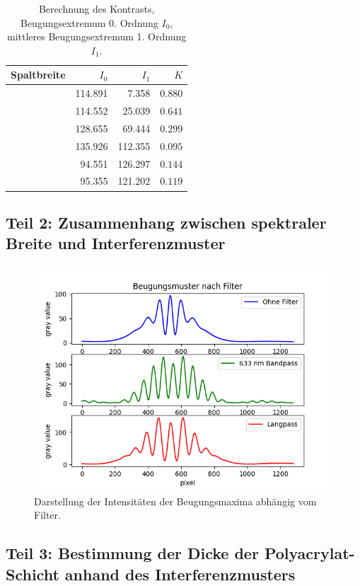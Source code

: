 \documentclass{article}
\begin{document}
\begin{table}[H]
\caption{Berechnung des Kontrasts, Beugungsextremum 0. Ordnung $I_0$, mittleres Beugungsextremum 1. Ordnung $I_1$.}
\begin{tabular}{l|rr|r}
Spaltbreite & $I_0$ & $I_1$ & $K$ \\
\hline
 & 114.891 &   7.358 & $0.880$ \\
 & 114.552 &  25.039 & $0.641$ \\
 & 128.655 &  69.444 & $0.299$ \\
 & 135.926 & 112.355 & $0.095$ \\
 & 94.551  & 126.297 & $0.144$ \\
 & 95.355 &  121.202 & $0.119$
\end{tabular}
\end{table}



\subsection{Teil 2: Zusammenhang zwischen spektraler Breite und Interferenzmuster}


\begin{figure}[H]
\centering
\caption{Darstellung der Intensitäten der Beugungsmaxima abhängig vom Filter.}
\includegraphics[width=12cm]{filter.png}
\end{figure}



\subsection{Teil 3: Bestimmung der Dicke der Polyacrylat-Schicht anhand des Interferenzmusters}
\end{document}
